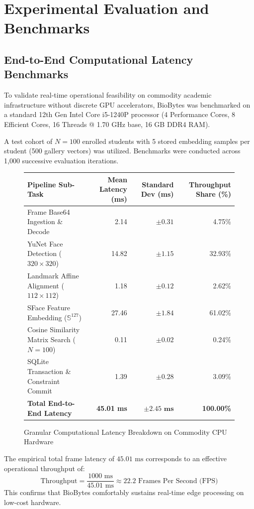 \chapter{Experimental Evaluation and Benchmarks}

\section{End-to-End Computational Latency Benchmarks}
To validate real-time operational feasibility on commodity academic infrastructure without discrete GPU accelerators, BioBytes was benchmarked on a standard 12th Gen Intel Core i5-1240P processor (4 Performance Cores, 8 Efficient Cores, 16 Threads @ 1.70 GHz base, 16 GB DDR4 RAM). 

A test cohort of $N = 100$ enrolled students with 5 stored embedding samples per student (500 gallery vectors) was utilized. Benchmarks were conducted across 1,000 successive evaluation iterations.

\begin{figure}[htbp]
\centering
\small
\renewcommand{\arraystretch}{1.2}
\begin{tabular}{|l|r|r|r|}
\hline
\textbf{Pipeline Sub-Task} & \textbf{Mean Latency (ms)} & \textbf{Standard Dev (ms)} & \textbf{Throughput Share (\%)} \\
\hline
Frame Base64 Ingestion \& Decode & 2.14 & $\pm 0.31$ & 4.75\% \\
YuNet Face Detection ($320 \times 320$) & 14.82 & $\pm 1.15$ & 32.93\% \\
Landmark Affine Alignment ($112 \times 112$) & 1.18 & $\pm 0.12$ & 2.62\% \\
SFace Feature Embedding ($\mathbb{S}^{127}$) & 27.46 & $\pm 1.84$ & 61.02\% \\
Cosine Similarity Matrix Search ($N=100$) & 0.11 & $\pm 0.02$ & 0.24\% \\
SQLite Transaction \& Constraint Commit & 1.39 & $\pm 0.28$ & 3.09\% \\
\hline
\textbf{Total End-to-End Latency} & \textbf{45.01 ms} & $\mathbf{\pm 2.45\text{ ms}}$ & \textbf{100.00\%} \\
\hline
\end{tabular}
\caption{Granular Computational Latency Breakdown on Commodity CPU Hardware}
\label{fig:latency_table}
\end{figure}

The empirical total frame latency of $45.01\text{ ms}$ corresponds to an effective operational throughput of:
\begin{equation}
\text{Throughput} = \frac{1000\text{ ms}}{45.01\text{ ms}} \approx 22.2\text{ Frames Per Second (FPS)}
\end{equation}
This confirms that BioBytes comfortably sustains real-time edge processing on low-cost hardware.

